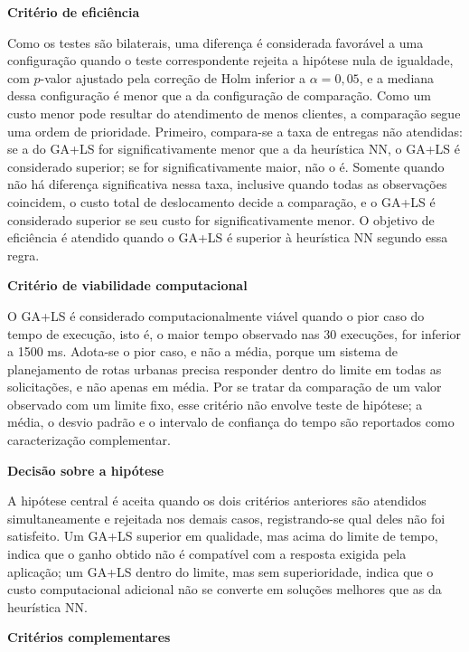 \begin{alineas}
	\item \textbf{Critério de eficiência}

	Como os testes são bilaterais, uma diferença é considerada favorável a uma
	configuração quando o teste correspondente rejeita a hipótese nula de igualdade, com
	$p$-valor ajustado pela correção de Holm inferior a $\alpha = 0{,}05$, e a mediana
	dessa configuração é menor que a da configuração de comparação. Como um custo menor
	pode resultar do atendimento de menos clientes, a comparação segue uma ordem de
	prioridade. Primeiro, compara-se a taxa de entregas não atendidas: se a do GA+LS for
	significativamente menor que a da heurística NN, o GA+LS é considerado superior; se
	for significativamente maior, não o é. Somente quando não há diferença significativa
	nessa taxa, inclusive quando todas as observações coincidem, o custo total de
	deslocamento decide a comparação, e o GA+LS é considerado superior se seu custo for
	significativamente menor. O objetivo de eficiência é atendido quando o GA+LS é
	superior à heurística NN segundo essa regra.

	\item \textbf{Critério de viabilidade computacional}

	O GA+LS é considerado computacionalmente viável quando o pior caso do tempo de
	execução, isto é, o maior tempo observado nas 30 execuções, for inferior a 1500 ms.
	Adota-se o pior caso, e não a média, porque um sistema de planejamento de rotas
	urbanas precisa responder dentro do limite em todas as solicitações, e não apenas em
	média. Por se tratar da comparação de um valor observado com um limite fixo, esse
	critério não envolve teste de hipótese; a média, o desvio padrão e o intervalo de
	confiança do tempo são reportados como caracterização complementar.

	\item \textbf{Decisão sobre a hipótese}

	A hipótese central é aceita quando os dois critérios anteriores são atendidos
	simultaneamente e rejeitada nos demais casos, registrando-se qual deles não foi
	satisfeito. Um GA+LS superior em qualidade, mas acima do limite de tempo, indica que o
	ganho obtido não é compatível com a resposta exigida pela aplicação; um GA+LS dentro do
	limite, mas sem superioridade, indica que o custo computacional adicional não se
	converte em soluções melhores que as da heurística NN.

	\item \textbf{Critérios complementares}


\end{alineas}

